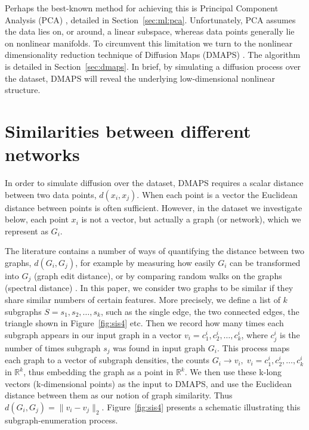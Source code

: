 Perhaps the best-known method for achieving this is Principal
Component Analysis (PCA) \cite{jolliffe_principal_2014}, detailed in
Section~\ref{sec:ml:pca}. Unfortunately, PCA assumes the data lies on,
or around, a linear subspace, whereas data points generally lie on
nonlinear manifolds. To circumvent this limitation we turn to the
nonlinear dimensionality reduction technique of Diffusion Maps (DMAPS)
\cite{coifman_diffusion_2006}. The algorithm is detailed in
Section~\ref{sec:dmaps}. In brief, by simulating a diffusion process
over the dataset, DMAPS will reveal the underlying low-dimensional
nonlinear structure.

\section{Similarities between different networks}

In order to simulate diffusion over the dataset, DMAPS requires a
scalar distance between two data points, $d(x_i, x_j)$. When each
point is a vector the Euclidean distance between points is often
sufficient. However, in the dataset we investigate below, each point
$x_i$ is not a vector, but actually a graph (or network), which we
represent as $G_i$.

The literature contains a number of ways of quantifying the distance
between two graphs, $d(G_i, G_j)$, for example by measuring how easily
$G_i$ can be transformed into $G_j$ (graph edit distance), or by
comparing random walks on the graphs (spectral distance)
\cite{bunke_graph_1998,gao_survey_2010,papadimitriou_web_2010,vishwanathan_graph_2010}. In
this paper, we consider two graphs to be similar if they share similar
numbers of certain features. More precisely, we define a list of $k$
subgraphs $S = {s_1, s_2, \dots, s_k}$, such as the single edge, the
two connected edges, the triangle shown in Figure~\ref{fig:sis4} etc. Then we
record how many times each subgraph appears in our input graph in a
vector $v_i = {c_1^i, c_2^i, \dots, c_k^i}$, where $c_j^i$ is the
number of times subgraph $s_j$ was found in input graph $G_i$. This
process maps each graph to a vector of subgraph densities, the counts
$G_i \rightarrow v_i, \; v_i = {c_1^i, c_2^i, \dots, c_k^i}$ in
$\mathbb{R}^k$, thus embedding the graph as a point in
$\mathbb{R}^k$. We then use these k-long vectors (k-dimensional
points) as the input to DMAPS, and use the Euclidean distance between
them as our notion of graph similarity. Thus
$d(G_i, G_j) = \| v_i - v_j \|_2$. Figure~\ref{fig:sis4} presents a schematic
illustrating this subgraph-enumeration process.


